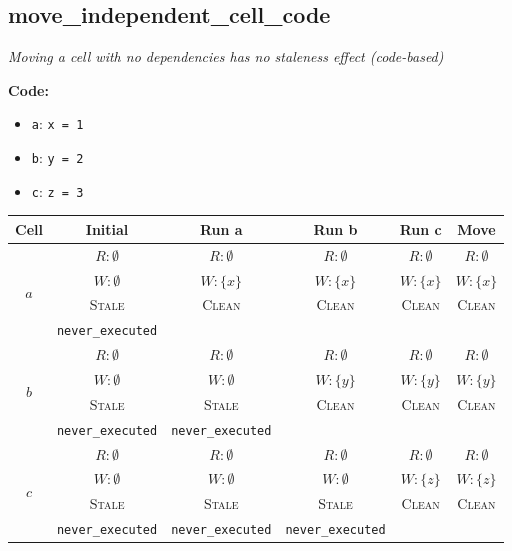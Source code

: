\documentclass{article}
\begin{document}
\subsection{move\_independent\_cell\_code}
\textit{Moving a cell with no dependencies has no staleness effect (code-based)}

\textbf{Code:}
\begin{itemize}
  \item \texttt{a}: \verb|x = 1|
  \item \texttt{b}: \verb|y = 2|
  \item \texttt{c}: \verb|z = 3|
\end{itemize}

\begin{center}
\small
\begin{tabular}{|c|c|c|c|c|c|}
\hline
\textbf{Cell} & \textbf{Initial} & \textbf{Run a} & \textbf{Run b} & \textbf{Run c} & \textbf{Move} \\
\hline
\multirow{4}{*}{$a$}
  & $R: \emptyset$ & $R: \emptyset$ & $R: \emptyset$ & $R: \emptyset$ & $R: \emptyset$ \\
  & $W: \emptyset$ & $W: \{x\}$ & $W: \{x\}$ & $W: \{x\}$ & $W: \{x\}$ \\
  & \textsc{Stale} & \textsc{Clean} & \textsc{Clean} & \textsc{Clean} & \textsc{Clean} \\
  & \footnotesize\texttt{never\_executed} &  &  &  &  \\
\hline
\multirow{4}{*}{$b$}
  & $R: \emptyset$ & $R: \emptyset$ & $R: \emptyset$ & $R: \emptyset$ & $R: \emptyset$ \\
  & $W: \emptyset$ & $W: \emptyset$ & $W: \{y\}$ & $W: \{y\}$ & $W: \{y\}$ \\
  & \textsc{Stale} & \textsc{Stale} & \textsc{Clean} & \textsc{Clean} & \textsc{Clean} \\
  & \footnotesize\texttt{never\_executed} & \footnotesize\texttt{never\_executed} &  &  &  \\
\hline
\multirow{4}{*}{$c$}
  & $R: \emptyset$ & $R: \emptyset$ & $R: \emptyset$ & $R: \emptyset$ & $R: \emptyset$ \\
  & $W: \emptyset$ & $W: \emptyset$ & $W: \emptyset$ & $W: \{z\}$ & $W: \{z\}$ \\
  & \textsc{Stale} & \textsc{Stale} & \textsc{Stale} & \textsc{Clean} & \textsc{Clean} \\
  & \footnotesize\texttt{never\_executed} & \footnotesize\texttt{never\_executed} & \footnotesize\texttt{never\_executed} &  &  \\
\hline
\end{tabular}
\end{center}
\end{document}

